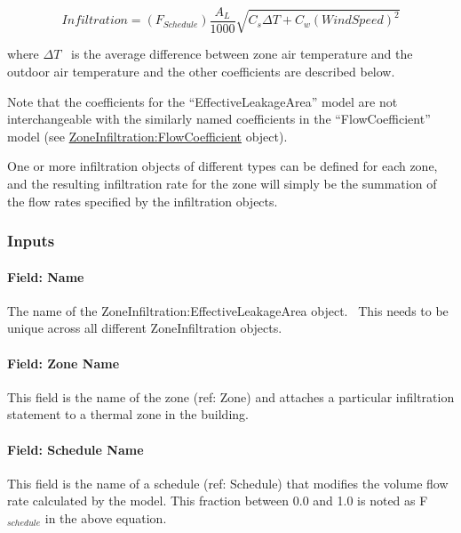 \begin{equation}
Infiltration = \left( {{F_{Schedule}}} \right)\frac{{{A_L}}}{{1000}}\sqrt {{C_s}\Delta T + {C_w}{{\left( {WindSpeed} \right)}^2}}
\end{equation}

where \(\Delta T\) ~is the average difference between zone air temperature and the outdoor air temperature and the other coefficients are described below.

Note that the coefficients for the ``EffectiveLeakageArea'' model are not interchangeable with the similarly named coefficients in the ``FlowCoefficient'' model (see \hyperref[zoneinfiltrationflowcoefficient]{ZoneInfiltration:FlowCoefficient} object).

One or more infiltration objects of different types can be defined for each zone, and the resulting infiltration rate for the zone will simply be the summation of the flow rates specified by the infiltration objects.

\subsubsection{Inputs}\label{inputs-1-005}

\paragraph{Field: Name}\label{field-name-1-004}

The name of the ZoneInfiltration:EffectiveLeakageArea object.~ This needs to be unique across all different ZoneInfiltration objects.

\paragraph{Field: Zone Name}\label{field-zone-name-002}

This field is the name of the zone (ref: Zone) and attaches a particular infiltration statement to a thermal zone in the building.

\paragraph{Field: Schedule Name}\label{field-schedule-name-1}

This field is the name of a schedule (ref: Schedule) that modifies the volume flow rate calculated by the model. This fraction between 0.0 and 1.0 is noted as F\(_{schedule}\) in the above equation.

